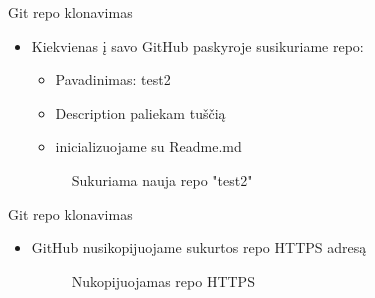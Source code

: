 \documentclass[11pt,xcolor=table]{beamer}
\begin{document}
\begin{frame}{Git repo klonavimas}
\begin{itemize}
\item Kiekvienas į savo GitHub paskyroje susikuriame repo:
\begin{itemize}
\item Pavadinimas: test2
\item Description paliekam tuščią
\item inicializuojame su Readme.md
\end{itemize}
\begin{figure}
\caption{Sukuriama nauja repo "test2"}
\end{figure}
\end{itemize}
\end{frame}


\begin{frame}{Git repo klonavimas}
\begin{itemize}
\item GitHub nusikopijuojame sukurtos repo HTTPS adresą
\begin{figure}
\caption{Nukopijuojamas repo HTTPS}
\end{figure}
\end{itemize}
\end{frame}
\end{document}
